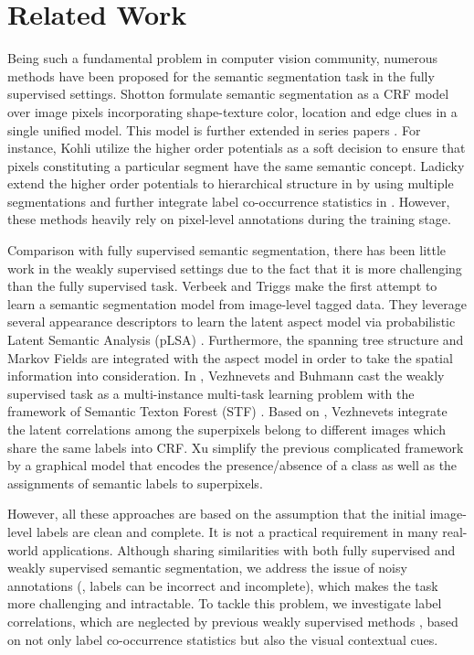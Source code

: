 \section{Related Work}
Being such a fundamental problem in computer vision community, numerous methods have been proposed for the semantic segmentation task in the fully supervised settings. Shotton \etal \cite{shotton2006textonboost} formulate semantic segmentation as a CRF model over image pixels incorporating shape-texture color, location and edge clues in a single unified model. This model is further extended in series papers \cite{kohli2009robust,ladicky2009associative,ladicky2010graph}. For instance, Kohli \etal utilize the higher order potentials \cite{kohli2009robust} as a soft decision to ensure that pixels constituting a particular segment have the same semantic concept. Ladicky \etal extend the higher order potentials to hierarchical structure in \cite{ladicky2009associative} by using multiple segmentations and further integrate label co-occurrence statistics in \cite{ladicky2010graph}. However, these methods heavily rely on pixel-level annotations during the training stage.

Comparison with fully supervised semantic segmentation, there has been little work in the weakly supervised settings due to the fact that it is more challenging than the fully supervised task. Verbeek and Triggs \cite{verbeek2007region} make the first attempt to learn a semantic segmentation model from image-level tagged data. They leverage several appearance descriptors to learn the latent aspect model via probabilistic Latent Semantic Analysis (pLSA) \cite{hofmann1999probabilistic}. Furthermore, the spanning tree structure and Markov Fields are integrated with the aspect model in order to take the spatial information into consideration. In \cite{vezhnevets2010towards}, Vezhnevets and Buhmann cast the weakly supervised task as a multi-instance multi-task learning problem with the framework of Semantic Texton Forest (STF) \cite{shotton2008semantic}. Based on \cite{vezhnevets2010towards}, Vezhnevets \etal \cite{vezhnevets2011weakly,vezhnevets2012weakly} integrate the latent correlations among the superpixels belong to different images which share the same labels into CRF. Xu \etal \cite{xu2014tell} simplify the previous complicated framework by a graphical model that encodes the presence/absence of a class as well as the assignments of semantic labels to superpixels.

However, all these approaches are based on the assumption that the initial image-level labels are clean and complete. It is not a practical requirement in many real-world applications. Although sharing similarities with both fully supervised and weakly supervised semantic segmentation, we address the issue of noisy annotations (\eg, labels can be incorrect and incomplete), which makes the task more challenging and intractable. To tackle this problem, we investigate label correlations, which are neglected by previous weakly supervised methods \cite{verbeek2007region,vezhnevets2010towards,vezhnevets2011weakly,vezhnevets2012weakly,xu2014tell}, based on not only label co-occurrence statistics but also the visual contextual cues.


